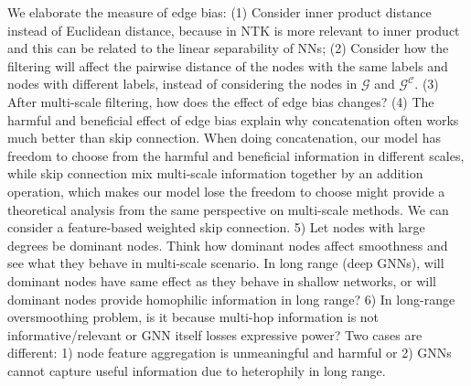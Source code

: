\documentclass{article}
\newcommand{\0}{{\boldsymbol{0}}}
\newcommand{\6}{{\partial}}
\newcommand{\8}{{\infty}}
\newcommand{\4}{{\nabla}}
\begin{document}
We elaborate the measure of edge bias: (1) Consider inner product distance instead of Euclidean distance, because in NTK is more relevant to inner product and this can be related to the linear separability of NNs; (2) Consider how the filtering will affect the pairwise distance of the nodes with the same labels and nodes with different labels, instead of considering the nodes in $\mathcal{G}$ and $\mathcal{G^C}$. (3) After multi-scale filtering, how does the effect of edge bias changes? (4) The harmful and beneficial effect of edge bias explain why concatenation often works much better than skip connection. When doing concatenation, our model has freedom to choose from the harmful and beneficial information in different scales, while skip connection mix multi-scale information together by an addition operation, which makes our model lose the freedom to choose \cite{oono2020optimization} might provide a theoretical analysis from the same perspective on multi-scale methods. We can consider a feature-based weighted skip connection. 5) Let nodes with large degrees be dominant nodes. Think how dominant nodes affect smoothness and see what they behave in multi-scale scenario. In long range (deep GNNs), will dominant nodes have same effect as they behave in shallow networks, or will dominant nodes provide homophilic information in long range? 6) In long-range oversmoothing problem, is it because multi-hop information is not informative/relevant or GNN itself losses expressive power? Two cases are different: 1) node feature aggregation is unmeaningful and harmful or 2) GNNs cannot capture useful information due to heterophily in long range.  
\fi
\end{document}
